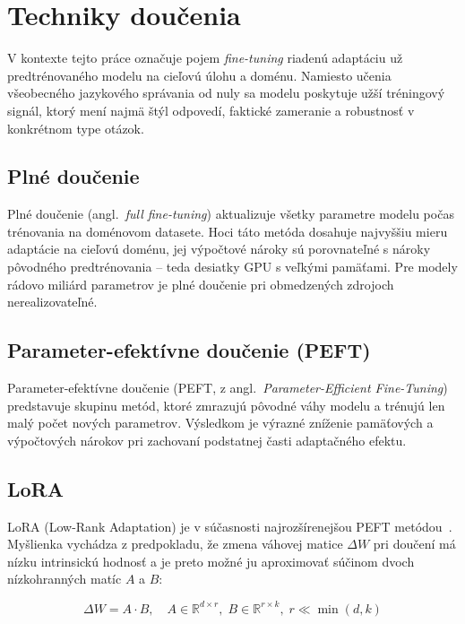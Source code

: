 \section{Techniky doučenia}

V kontexte tejto práce označuje pojem \emph{fine-tuning} riadenú adaptáciu už predtrénovaného modelu na cieľovú úlohu a doménu. Namiesto učenia všeobecného jazykového správania od nuly sa modelu poskytuje užší tréningový signál, ktorý mení najmä štýl odpovedí, faktické zameranie a robustnosť v konkrétnom type otázok.

\subsection{Plné doučenie}

Plné doučenie (angl.\ \emph{full fine-tuning}) aktualizuje všetky parametre modelu počas trénovania na doménovom datasete. Hoci táto metóda dosahuje najvyššiu mieru adaptácie na cieľovú doménu, jej výpočtové nároky sú porovnateľné s nároky pôvodného predtrénovania -- teda desiatky GPU s veľkými pamäťami. Pre modely rádovo miliárd parametrov je plné doučenie pri obmedzených zdrojoch nerealizovateľné.

\subsection{Parameter-efektívne doučenie (PEFT)}

Parameter-efektívne doučenie (PEFT, z angl.\ \emph{Parameter-Efficient Fine-Tuning}) predstavuje skupinu metód, ktoré zmrazujú pôvodné váhy modelu a trénujú len malý počet nových parametrov. Výsledkom je výrazné zníženie pamäťových a výpočtových nárokov pri zachovaní podstatnej časti adaptačného efektu.

\subsection{LoRA}

LoRA (Low-Rank Adaptation) je v súčasnosti najrozšírenejšou PEFT metódou~\cite{Hu2021LoRA}. Myšlienka vychádza z predpokladu, že zmena váhovej matice $\Delta W$ pri doučení má nízku intrinsickú hodnosť a je preto možné ju aproximovať súčinom dvoch nízkohranných matíc $A$ a $B$:

\begin{equation}
    \Delta W = A \cdot B, \quad A \in \mathbb{R}^{d \times r},\; B \in \mathbb{R}^{r \times k},\; r \ll \min(d, k)
\end{equation}


